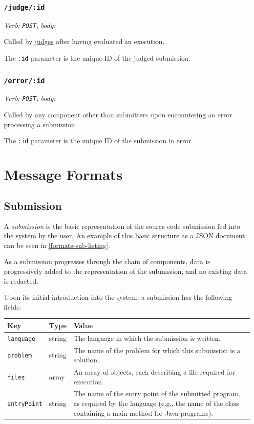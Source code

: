 \documentclass[11pt,letterpaper]{article}
\begin{document}
\subsubsection{\texttt{/judge/:id}}

\emph{Verb: \texttt{POST}; body: }

Called by \hyperref[design-executor-judge]{judges} after having evaluated an
execution.

The \texttt{:id} parameter is the unique ID of the judged submission.

\subsubsection{\texttt{/error/:id}}

\emph{Verb: \texttt{POST}; body: }

Called by any component other than submitters upon encountering an error
processing a submission.

The \texttt{:id} parameter is the unique ID of the submission in error.

\section{Message Formats}
\label{formats}

\subsection{Submission}
\label{formats-sub}

A \emph{submission} is the basic representation of the source code submission
fed into the system by the user. An example of this basic structure as a JSON
document can be seen in \autoref{formats-sub-listing}.

As a submission progresses through the chain of components, data is
progressively added to the representation of the submission, and no existing
data is redacted.

Upon its initial introduction into the system, a submission has the following
fields:

\nopagebreak
\begin{tabulary}{\textwidth}{ | l | l | L | }
    \hline
    \textbf{Key} & \textbf{Type} & \textbf{Value} \\
    \hline
    \texttt{language} & string & The language in which the submission is
        written. \\
    \hline
    \texttt{problem} & string & The name of the problem for which this
        submission is a solution. \\
    \hline
    \texttt{files} & array & An array of objects, each describing a file
        required for execution. \\
    \hline
    \texttt{entryPoint} & string & The name of the entry point of the submitted
        program, as required by the language (e.g., the name of the class
        containing a main method for Java programs). \\
    \hline
\end{tabulary}
\end{document}
